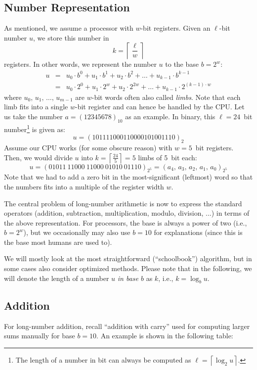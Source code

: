 \subsection{Number Representation}
As mentioned, we assume a processor with $w$-bit registers. Given an $\ell$-bit number $u$, we store this number in 
$$
k = \left\lceil \frac{\ell}{w}\right\rceil
$$
registers. In other words, we represent the number $u$ to the base $b = 2^w$:
\begin{eqnarray}
u &=& u_0 \cdot b^0 + u_1 \cdot b^1 + u_2 \cdot b^2 + \ldots + u_{k-1} \cdot b^{k-1}  \nonumber \\
  &=& u_0 \cdot 2^0 + u_1 \cdot 2^w + u_2 \cdot 2^{2w} + \ldots + u_{k-1} \cdot 2^{\left(k-1\right)\cdot w} \nonumber
\end{eqnarray}
where $u_0,\,u_1,\,\ldots,\,u_{m-1}$ are $w$-bit words often also called \emph{limbs}. Note that each limb fits into a single $w$-bit register and can hence be handled by the \ac{CPU}.
Let us take the number $a = \left(12345678\right)_{10}$ as an example. In binary, this $\ell = 24$~bit number\footnote{The length of a number in bit can always be computed as $\ell = \left\lceil \log_2{u} \right\rceil$.} is given as:
$$
u = \left(101111000110000101001110\right)_2
$$
Assume our \ac{CPU} works (for some obscure reason) with $w = 5$~bit registers. Then,  we would divide $u$ into $k = \left\lceil \frac{24}{5}\right\rceil = 5$ limbs of 5~bit each:
$$
u = \left(01011\ 11000\ 11000\ 01010\ 01110\right)_{2^5} = (a_4,\,a_3,\,a_2,\,a_1,\,a_0)_{2^5}
$$
Note that we had to add a zero bit in the most-significant (leftmost) word so that the numbers fits into a multiple of the register width $w$. 

The central problem of long-number arithmetic is now to express the standard operators (addition, subtraction, multiplication, modulo, division, ...) in terms of the above representation. For processors, the base is always a power of two (i.e., $b = 2^w$), but we occasionally may also use $b = 10$ for explanations (since this is the base most humans are used to).

We will mostly look at the most straightforward (``schoolbook'') algorithm, but in some cases also consider optimized methods. Please note that in the following, we will denote the length of a number $u$ \emph{in base $b$} as $k$, i.e., $k = \log_b u$.

\subsection{Addition}
For long-number addition, recall ``addition with carry'' used for computing larger sums manually for base $b = 10$. An example is shown in the following table:

